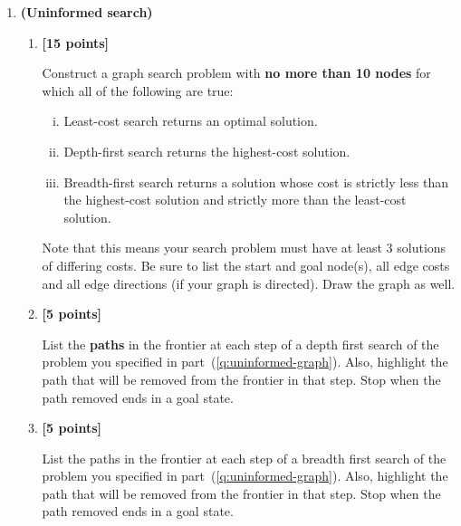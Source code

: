 \documentclass{article}
\newcounter{totalpoints}
\newcommand{\points}[1]{{\addtocounter{totalpoints}{#1}\textbf{[#1 points]}}}
\begin{document}
\pagestyle{myheadings}

\clearpage
\begin{enumerate}

\item \textbf{(Uninformed search)}
\begin{enumerate}
\item \points{15} \label{q:uninformed-graph}
Construct a graph search problem with \textbf{no more than 10 nodes} for which all of the following are true:
\begin{enumerate}[i.]
    \item Least-cost search returns an optimal solution.
    \item Depth-first search returns the highest-cost solution.
    \item Breadth-first search returns a solution whose cost is strictly less than the highest-cost solution and strictly more than the least-cost solution.
\end{enumerate}
Note that this means your search problem must have at least 3 solutions of differing costs.
Be sure to list the start and goal node(s), all edge costs and all edge directions (if your graph is directed). Draw the graph as well.

\begin{answer}{2.5in}
\end{answer}


\item \points{5}
List the \textbf{paths} in the frontier at each step of a depth first search of the problem you specified in part~(\ref{q:uninformed-graph}). Also, highlight the path that will be removed from the frontier in that step. Stop when the path removed ends in a goal state.

\begin{answer}{1in}
\end{answer}

\item \points{5}
List the paths in the frontier at each step of a breadth first search of the problem you specified in part~(\ref{q:uninformed-graph}). Also, highlight the path that will be removed from the frontier in that step. Stop when the path removed ends in a goal state.

\begin{answer}{1in}
\end{answer}


\end{enumerate}
\end{enumerate}
\end{document}
